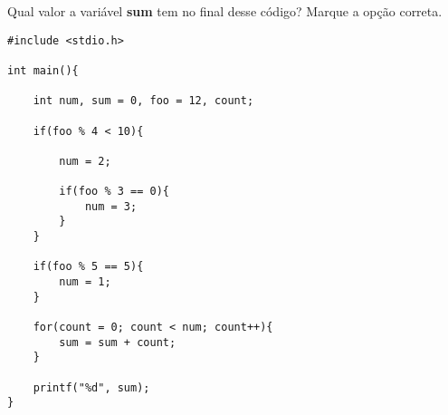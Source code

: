 
\question[10]

Qual valor a variável \textbf{sum} tem no final desse código? Marque a opção correta.

\begin{lstlisting}
#include <stdio.h>

int main(){
	
	int num, sum = 0, foo = 12, count;
	
	if(foo % 4 < 10){
	
		num = 2;
	
		if(foo % 3 == 0){
			num = 3;
		}
	}
	
	if(foo % 5 == 5){
		num = 1;
	}
	
	for(count = 0; count < num; count++){
		sum = sum + count;
	}
	
	printf("%d", sum);
}
\end{lstlisting}

\begin{oneparchoices}
\end{oneparchoices}

